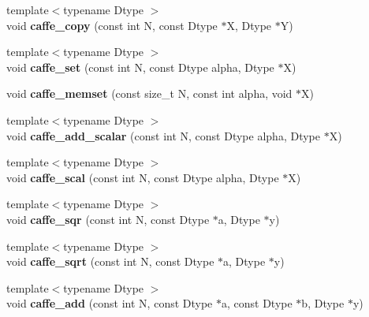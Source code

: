 \begin{DoxyCompactItemize}
\item 
{\footnotesize template$<$typename Dtype $>$ }\\void {\bfseries caffe\+\_\+copy} (const int N, const Dtype $\ast$X, Dtype $\ast$Y)\hypertarget{namespacecaffe_ac2f6a957bfbaa344f70ba068790d5aa4}{}\label{namespacecaffe_ac2f6a957bfbaa344f70ba068790d5aa4}

\item 
{\footnotesize template$<$typename Dtype $>$ }\\void {\bfseries caffe\+\_\+set} (const int N, const Dtype alpha, Dtype $\ast$X)\hypertarget{namespacecaffe_af2160c3cde52f95329fcbb81b39b1aed}{}\label{namespacecaffe_af2160c3cde52f95329fcbb81b39b1aed}

\item 
void {\bfseries caffe\+\_\+memset} (const size\+\_\+t N, const int alpha, void $\ast$X)\hypertarget{namespacecaffe_a4f3deeb6e840ee246779c7f29779d95f}{}\label{namespacecaffe_a4f3deeb6e840ee246779c7f29779d95f}

\item 
{\footnotesize template$<$typename Dtype $>$ }\\void {\bfseries caffe\+\_\+add\+\_\+scalar} (const int N, const Dtype alpha, Dtype $\ast$X)\hypertarget{namespacecaffe_afc858d53084f51cc3d473f6c46ab43c1}{}\label{namespacecaffe_afc858d53084f51cc3d473f6c46ab43c1}

\item 
{\footnotesize template$<$typename Dtype $>$ }\\void {\bfseries caffe\+\_\+scal} (const int N, const Dtype alpha, Dtype $\ast$X)\hypertarget{namespacecaffe_abe671d683d8798d8d269352238320ea0}{}\label{namespacecaffe_abe671d683d8798d8d269352238320ea0}

\item 
{\footnotesize template$<$typename Dtype $>$ }\\void {\bfseries caffe\+\_\+sqr} (const int N, const Dtype $\ast$a, Dtype $\ast$y)\hypertarget{namespacecaffe_a63c6ff86445f1d5ddfc7facde94a9a65}{}\label{namespacecaffe_a63c6ff86445f1d5ddfc7facde94a9a65}

\item 
{\footnotesize template$<$typename Dtype $>$ }\\void {\bfseries caffe\+\_\+sqrt} (const int N, const Dtype $\ast$a, Dtype $\ast$y)\hypertarget{namespacecaffe_ab86be911127edf51854d1437bc1be9fa}{}\label{namespacecaffe_ab86be911127edf51854d1437bc1be9fa}

\item 
{\footnotesize template$<$typename Dtype $>$ }\\void {\bfseries caffe\+\_\+add} (const int N, const Dtype $\ast$a, const Dtype $\ast$b, Dtype $\ast$y)\hypertarget{namespacecaffe_a9d20c15682437b1a5f2c8f7bc32bf6e9}{}\label{namespacecaffe_a9d20c15682437b1a5f2c8f7bc32bf6e9}


\end{DoxyCompactItemize}
